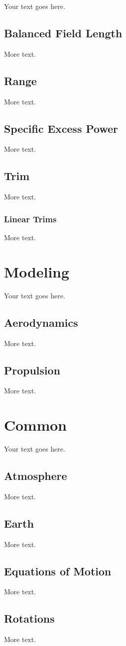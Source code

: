 \documentclass[11pt]{article} %
\begin{document}
Your text goes here.

\subsection{Balanced Field Length}

More text.

\subsection{Range}

More text.

\subsection{Specific Excess Power}

More text.

\subsection{Trim}

More text.

\subsubsection{Linear Trims}

More text.

\section{Modeling}

Your text goes here.

\subsection{Aerodynamics}

More text.

\subsection{Propulsion}

More text.

\section{Common}

Your text goes here.

\subsection{Atmosphere}

More text.

\subsection{Earth}

More text.

\subsection{Equations of Motion}

More text.

\subsection{Rotations}

More text.
\end{document}
